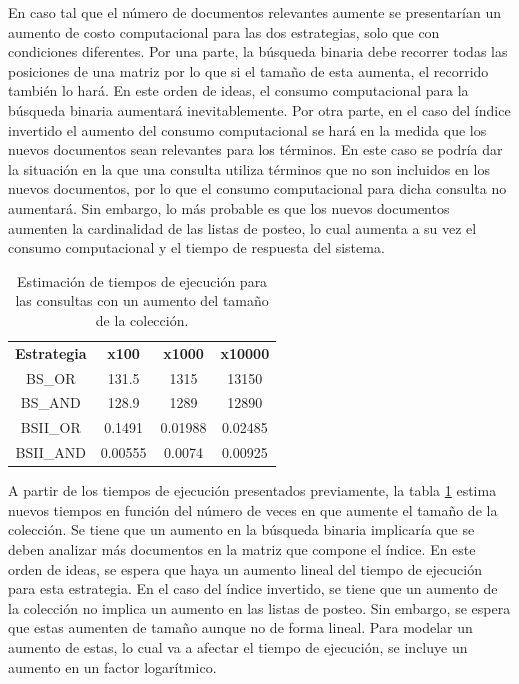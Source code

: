 En caso tal que el número de documentos relevantes aumente se presentarían un aumento de costo computacional para las dos estrategias, solo que con condiciones diferentes. Por una parte, la búsqueda binaria debe recorrer todas las posiciones de una matriz por lo que si el tamaño de esta aumenta, el recorrido también lo hará. En este orden de ideas, el consumo computacional para la búsqueda binaria aumentará inevitablemente. Por otra parte, en el caso del índice invertido el aumento del consumo computacional se hará en la medida que los nuevos documentos sean relevantes para los términos. En este caso se podría dar la situación en la que una consulta utiliza términos que no son incluidos en los nuevos documentos, por lo que el consumo computacional para dicha consulta no aumentará. Sin embargo, lo más probable es que los nuevos documentos aumenten la cardinalidad de las listas de posteo, lo cual aumenta a su vez el consumo computacional y el tiempo de respuesta del sistema.

\begin{table}[h]
    \centering
    \begin{tabular}{|c|c|c|c|}
        \textbf{Estrategia} & \textbf{x100} & \textbf{x1000} & \textbf{x10000} \\
        BS\_OR & 131.5 & 1315 & 13150 \\
        BS\_AND & 128.9 & 1289 & 12890 \\
        BSII\_OR & 0.1491 & 0.01988 & 0.02485 \\
        BSII\_AND & 0.00555 & 0.0074 & 0.00925 \\
    \end{tabular}
    \caption{Estimación de tiempos de ejecución para las consultas con un aumento del tamaño de la colección.}
    \label{tab:estimations}
\end{table}

A partir de los tiempos de ejecución presentados previamente, la tabla \ref{tab:estimations} estima nuevos tiempos en función del número de veces en que aumente el tamaño de la colección. Se tiene que un aumento en la búsqueda binaria implicaría que se deben analizar más documentos en la matriz que compone el índice. En este orden de ideas, se espera que haya un aumento lineal del tiempo de ejecución para esta estrategia. En el caso del índice invertido, se tiene que un aumento de la colección no implica un aumento en las listas de posteo. Sin embargo, se espera que estas aumenten de tamaño aunque no de forma lineal. Para modelar un aumento de estas, lo cual va a afectar el tiempo de ejecución, se incluye un aumento en un factor logarítmico. 

